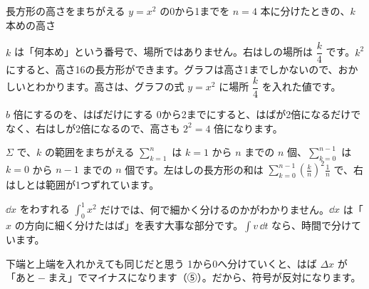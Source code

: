 
\begin{tsumazuki}{長方形の高さをまちがえる}
$y=x^2$ の0から1までを $n=4$ 本に分けたときの、$k$ 本めの高さ\par
{}
$k$ は「何本め」という番号で、場所ではありません。右はしの場所は $\dfrac{k}{4}$ です。$k^2$ にすると、高さ16の長方形ができます。グラフは高さ1までしかないので、おかしいとわかります。高さは、グラフの式 $y=x^2$ に場所 $\dfrac{k}{4}$ を入れた値です。
\end{tsumazuki}

\begin{tsumazuki}{$b$ 倍にするのを、はばだけにする}
0から2までにすると、はばが2倍になるだけでなく、右はしが2倍になるので、高さも $2^2=4$ 倍になります。
\end{tsumazuki}

\begin{tsumazuki}{$\Sigma$ で、$k$ の範囲をまちがえる}
$\displaystyle\sum_{k=1}^{n}$ は $k=1$ から $n$ までの $n$ 個、$\displaystyle\sum_{k=0}^{n-1}$ は $k=0$ から $n-1$ までの $n$ 個です。左はしの長方形の和は $\displaystyle\sum_{k=0}^{n-1}\left(\frac{k}{n}\right)^2\frac{1}{n}$ で、右はしとは範囲が1つずれています。
\end{tsumazuki}

\begin{tsumazuki}{$\dd x$ をわすれる}
$\displaystyle\int_0^1x^2$ だけでは、何で細かく分けるのかがわかりません。$\dd x$ は「$x$ の方向に細く分けたはば」を表す大事な部分です。$\displaystyle\int v\,\dd t$ なら、時間で分けています。
\end{tsumazuki}

\begin{tsumazuki}{下端と上端を入れかえても同じだと思う}
1から0へ分けていくと、はば $\Delta x$ が「あと${}-{}$まえ」でマイナスになります（⑤）。だから、符号が反対になります。
\end{tsumazuki}

